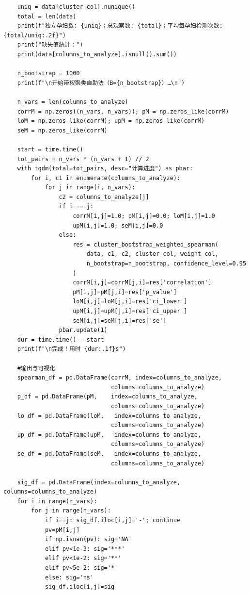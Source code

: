 \begin{lstlisting}
    uniq = data[cluster_col].nunique()
    total = len(data)
    print(f"独立孕妇数: {uniq}；总观察数: {total}；平均每孕妇检测次数: {total/uniq:.2f}")
    print("缺失值统计：")
    print(data[columns_to_analyze].isnull().sum())

    n_bootstrap = 1000
    print(f"\n开始带权聚类自助法（B={n_bootstrap}）…\n")

    n_vars = len(columns_to_analyze)
    corrM = np.zeros((n_vars, n_vars)); pM = np.zeros_like(corrM)
    loM = np.zeros_like(corrM); upM = np.zeros_like(corrM)
    seM = np.zeros_like(corrM)

    start = time.time()
    tot_pairs = n_vars * (n_vars + 1) // 2
    with tqdm(total=tot_pairs, desc="计算进度") as pbar:
        for i, c1 in enumerate(columns_to_analyze):
            for j in range(i, n_vars):
                c2 = columns_to_analyze[j]
                if i == j:
                    corrM[i,j]=1.0; pM[i,j]=0.0; loM[i,j]=1.0
                    upM[i,j]=1.0; seM[i,j]=0.0
                else:
                    res = cluster_bootstrap_weighted_spearman(
                        data, c1, c2, cluster_col, weight_col,
                        n_bootstrap=n_bootstrap, confidence_level=0.95
                    )
                    corrM[i,j]=corrM[j,i]=res['correlation']
                    pM[i,j]=pM[j,i]=res['p_value']
                    loM[i,j]=loM[j,i]=res['ci_lower']
                    upM[i,j]=upM[j,i]=res['ci_upper']
                    seM[i,j]=seM[j,i]=res['se']
                pbar.update(1)
    dur = time.time() - start
    print(f"\n完成！用时 {dur:.1f}s")

    #输出与可视化
    spearman_df = pd.DataFrame(corrM, index=columns_to_analyze, 
                               columns=columns_to_analyze)
    p_df = pd.DataFrame(pM,    index=columns_to_analyze, 
                               columns=columns_to_analyze)
    lo_df = pd.DataFrame(loM,   index=columns_to_analyze, 
                               columns=columns_to_analyze)
    up_df = pd.DataFrame(upM,   index=columns_to_analyze, 
                               columns=columns_to_analyze)
    se_df = pd.DataFrame(seM,   index=columns_to_analyze, 
                               columns=columns_to_analyze)

    sig_df = pd.DataFrame(index=columns_to_analyze, columns=columns_to_analyze)
    for i in range(n_vars):
        for j in range(n_vars):
            if i==j: sig_df.iloc[i,j]='-'; continue
            pv=pM[i,j]
            if np.isnan(pv): sig='NA'
            elif pv<1e-3: sig='***'
            elif pv<1e-2: sig='**'
            elif pv<5e-2: sig='*'
            else: sig='ns'
            sig_df.iloc[i,j]=sig


\end{lstlisting}
